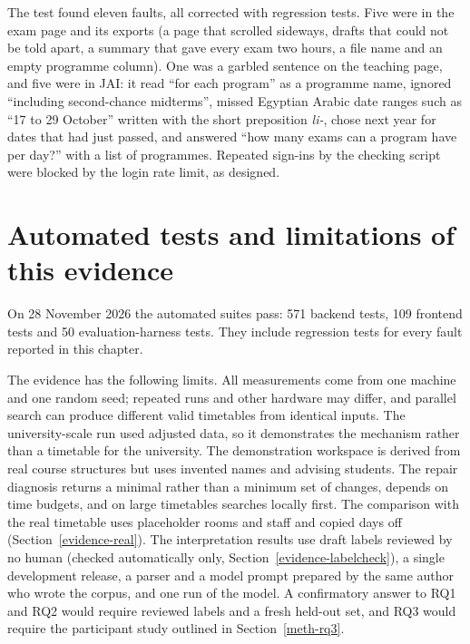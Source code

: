 The test found eleven faults, all corrected with regression tests. Five were in the exam page and its exports (a page that scrolled sideways, drafts that could not be told apart, a summary that gave every exam two hours, a file name and an empty programme column). One was a garbled sentence on the teaching page, and five were in JAI: it read ``for each program'' as a programme name, ignored ``including second-chance midterms'', missed Egyptian Arabic date ranges such as ``17 to 29 October'' written with the short preposition \emph{li-}, chose next year for dates that had just passed, and answered ``how many exams can a program have per day?'' with a list of programmes. Repeated sign-ins by the checking script were blocked by the login rate limit, as designed.

\section{Automated tests and limitations of this evidence}
On 28 November 2026 the automated suites pass: 571 backend tests, 109 frontend tests and 50 evaluation-harness tests. They include regression tests for every fault reported in this chapter.

The evidence has the following limits. All measurements come from one machine and one random seed; repeated runs and other hardware may differ, and parallel search can produce different valid timetables from identical inputs. The university-scale run used adjusted data, so it demonstrates the mechanism rather than a timetable for the university. The demonstration workspace is derived from real course structures but uses invented names and advising students. The repair diagnosis returns a minimal rather than a minimum set of changes, depends on time budgets, and on large timetables searches locally first. The comparison with the real timetable uses placeholder rooms and staff and copied days off (Section~\ref{evidence-real}). The interpretation results use draft labels reviewed by no human (checked automatically only, Section~\ref{evidence-labelcheck}), a single development release, a parser and a model prompt prepared by the same author who wrote the corpus, and one run of the model. A confirmatory answer to RQ1 and RQ2 would require reviewed labels and a fresh held-out set, and RQ3 would require the participant study outlined in Section~\ref{meth-rq3}.
